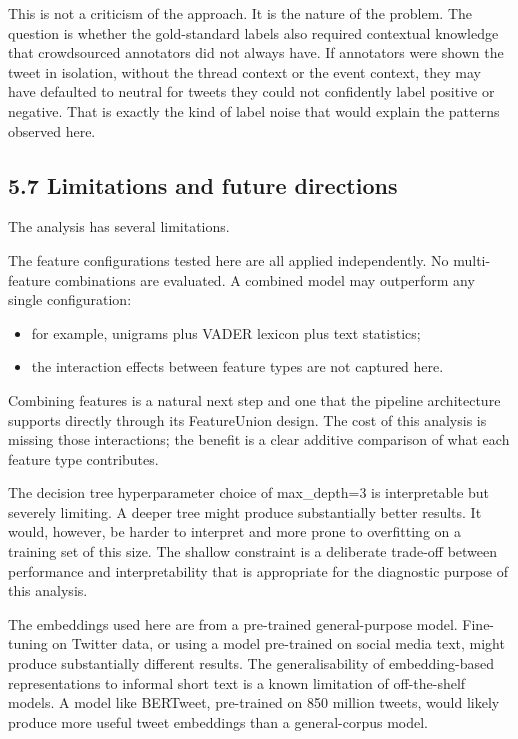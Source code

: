 \documentclass[12pt]{article}
\begin{document}
This is not a criticism of the approach. It is the nature of the problem. The question is whether the gold-standard labels also required contextual knowledge that crowdsourced annotators did not always have. If annotators were shown the tweet in isolation, without the thread context or the event context, they may have defaulted to neutral for tweets they could not confidently label positive or negative. That is exactly the kind of label noise that would explain the patterns observed here.

\subsection*{5.7 Limitations and future directions}

The analysis has several limitations.

The feature configurations tested here are all applied independently. No multi-feature combinations are evaluated. A combined model may outperform any single configuration:
\begin{itemize}
  \item for example, unigrams plus VADER lexicon plus text statistics;
  \item the interaction effects between feature types are not captured here.
\end{itemize} Combining features is a natural next step and one that the pipeline architecture supports directly through its FeatureUnion design. The cost of this analysis is missing those interactions; the benefit is a clear additive comparison of what each feature type contributes.

The decision tree hyperparameter choice of max\_depth=3 is interpretable but severely limiting. A deeper tree might produce substantially better results. It would, however, be harder to interpret and more prone to overfitting on a training set of this size. The shallow constraint is a deliberate trade-off between performance and interpretability that is appropriate for the diagnostic purpose of this analysis.

The embeddings used here are from a pre-trained general-purpose model. Fine-tuning on Twitter data, or using a model pre-trained on social media text, might produce substantially different results. The generalisability of embedding-based representations to informal short text is a known limitation of off-the-shelf models. A model like BERTweet, pre-trained on 850 million tweets, would likely produce more useful tweet embeddings than a general-corpus model.
\end{document}

